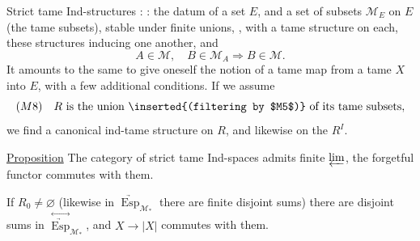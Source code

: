 Strict tame Ind-structures   :  : the datum of a set $E$, and a set of subsets $\mathcal M_E$ on $E$ (the tame subsets), stable under finite unions, , with a tame structure on each, these structures inducing one another, and
\[
 A\in\mathcal M,\quad B\in\mathcal M_A\Longrightarrow B\in\mathcal M.
\]
It amounts to the same to give oneself the notion of a tame map from a tame $X$ into $E$, with  a few additional conditions. If we assume
\[
 (M8)\quad R\text{ is the union \inserted{(filtering by $M5$)} of its tame subsets},
\]
we find a canonical ind-tame structure on $R$, and likewise on the $R^I$.

\uline{Proposition} The category of   strict tame Ind-spaces admits finite $\varprojlim$, the forgetful functor commutes with them.

If $R_0\ne\varnothing$ (likewise in $\underrightarrow{\operatorname{Esp}}_{\mathcal M_*}$ there are finite disjoint sums) there are disjoint sums   in $\overset{\leftrightarrow}{\underrightarrow{\operatorname{Esp}}}_{\mathcal M_*}$, and $X\longrightarrow |X|$ commutes with them.
